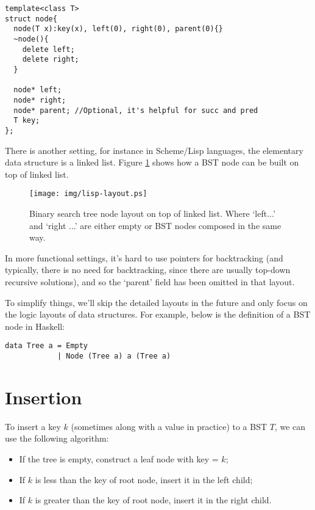 \documentclass[UTF8]{article}
\begin{document}
\lstset{language=C++}
\begin{lstlisting}
template<class T>
struct node{
  node(T x):key(x), left(0), right(0), parent(0){}
  ~node(){
    delete left;
    delete right;
  }

  node* left;
  node* right;
  node* parent; //Optional, it's helpful for succ and pred
  T key;
};
\end{lstlisting}

There is another setting, for instance in Scheme/Lisp languages, the elementary
data structure is a linked list. Figure \ref{fig:lisp-layout} shows how a BST node can be built on top of linked list.

\begin{figure}[htbp]
       \begin{center}
        \texttt{[image: img/lisp-layout.ps]}
        \caption{Binary search tree node layout on top of linked list. Where `left...' and `right ...' are either empty or BST nodes composed in the same way.} \label{fig:lisp-layout}
       \end{center}
\end{figure}

In more functional settings, it's hard to use pointers for backtracking (and typically, there is no need for backtracking, since there are usually top-down recursive solutions), and so the `parent' field has been omitted in that layout.

To simplify things, we'll skip the detailed layouts in the future and only
focus on the logic layouts of data structures. For example, below is the definition
of a BST node in Haskell:

\lstset{language=Haskell}
\begin{lstlisting}
data Tree a = Empty
            | Node (Tree a) a (Tree a)
\end{lstlisting}

\section{Insertion}

To insert a key $k$ (sometimes along with a value in practice) to a BST $T$, we can use the following algorithm:

\begin{itemize}
\item If the tree is empty, construct a leaf node with key = $k$;
\item If $k$ is less than the key of root node, insert it in the left child;
\item If $k$ is greater than the key of root node, insert it in the right child.
\end{itemize}
\end{document}
